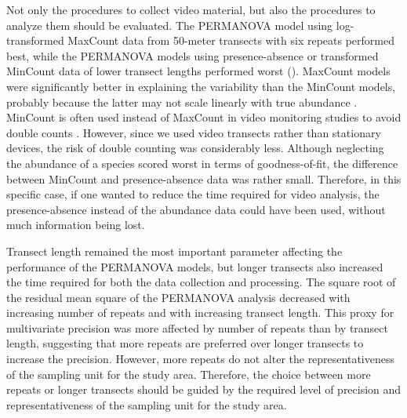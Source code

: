 \documentclass[10pt,letterpaper]{article}
\begin{document}
Not only the procedures to collect video material, but also the procedures to analyze them should be evaluated. The PERMANOVA model using log-transformed MaxCount data from 50-meter transects with six repeats performed best, while the PERMANOVA models using presence-absence or transformed MinCount data of lower transect lengths performed worst (). MaxCount models were significantly better in explaining the variability than the MinCount models, probably because the latter may not scale linearly with true abundance \cite{Schobernd2014}. MinCount is often used instead of MaxCount in video monitoring studies to avoid double counts \cite{Schobernd2014}. However, since we used video transects rather than stationary devices, the risk of double counting was considerably less. Although neglecting the abundance of a species scored worst in terms of goodness-of-fit, the difference between MinCount and presence-absence data was rather small. Therefore, in this specific case, if one wanted to reduce the time required for video analysis, the presence-absence instead of the abundance data could have been used, without much information being lost. 

Transect length remained the most important parameter affecting the performance of the PERMANOVA models, but longer transects also increased the time required for both the data collection and processing. The square root of the residual mean square of the PERMANOVA analysis decreased with increasing number of repeats and with increasing transect length. This proxy for multivariate precision was more affected by number of repeats than by transect length, suggesting that more repeats are preferred over longer transects to increase the precision. However, more repeats do not alter the representativeness of the sampling unit for the study area. Therefore, the choice between more repeats or longer transects should be guided by the required level of precision and representativeness of the sampling unit for the study area. 
\end{document}
